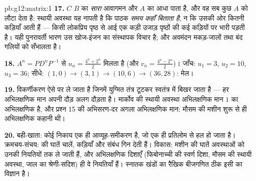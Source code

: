 \begin{solution}{pb:g12:matrix:1}
\textbf{17.} $C$ $B$ का \emph{सारा} आवागमन और $A$ का आधा पाता है, और वह
सब कुछ $A$ को लौटा देता है: स्थायी अवस्था यह नापती है कि पाठक \emph{समय
कहाँ बिताता है}, न कि उसकी ओर कितनी कड़ियाँ आती हैं --- किसी लोकप्रिय पृष्ठ
से आई एक कड़ी उजाड़ पृष्ठों की कई कड़ियों पर भारी पड़ती है। यही पुनरावर्ती
भारण उस खोज-इंजन का संस्थापक विचार है; और अवमंदन मकड़-जालों तथा बंद गलियों को
सँभालता है।

\textbf{18.} $A^n = P D^n P^{-1}$ से $u_n = \frac{4^n + 2^n}{2}$ मिलता है (और $v_n = \frac{4^n - 2^n}{2}$)। जाँच: $u_1 = 3$, $u_2 = 10$, $u_3 = 36$;
सीधे: $(1,0) \to (3,1) \to (10,6) \to
(36, 28)$: मेल।

\textbf{19.} विकर्णीकरण ऐसे  पर ले जाता है जिनमें युग्मित तंत्र
टूटकर स्वतंत्र  में बिखर जाता है --- हर अभिलक्षणिक मान अपनी
दौड़ अलग दौड़ता है। मार्कोव की स्थायी अवस्था अभिलक्षणिक मान $1$ का अभिलक्षणिक
 है, और प्रश्न 15 की अभिसरण-दर अगला अभिलक्षणिक मान: मौसम की मशीन शुरू से
ही अभिलक्षणिक कहानी थी।

\textbf{20.} बही-खाता: कोई निकाय एक ही आव्यूह-समीकरण है, जो एक ही प्रतिलोम से
हल हो जाता है। क्रमचय-संचय:  की घातें चालें, कड़ियाँ और संबंध
गिन देती हैं। विकास: मशीन की घातें अवस्थाओं को उनकी नियतियों तक ले जाती हैं,
और अभिलक्षणिक दिशाएँ (फिबोनाच्ची की स्वर्ण दिशा, मौसम की स्थायी अवस्था, जाल का
श्रेणी-सदिश) ही वे नियतियाँ हैं। स्नातक खंडों का रैखिक बीजगणित ठीक इसी का
विज्ञान है।
\end{solution}
